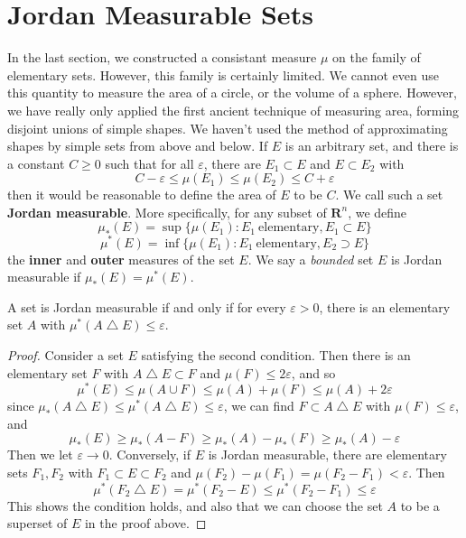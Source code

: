 \section{Jordan Measurable Sets}

In the last section, we constructed a consistant measure $\mu$ on the family of elementary sets. However, this family is certainly limited. We cannot even use this quantity to measure the area of a circle, or the volume of a sphere. However, we have really only applied the first ancient technique of measuring area, forming disjoint unions of simple shapes. We haven't used the method of approximating shapes by simple sets from above and below. If $E$ is an arbitrary set, and there is a constant $C \geq 0$ such that for all $\varepsilon$, there are $E_1 \subset E$ and $E \subset E_2$ with
%
\[ C - \varepsilon \leq \mu(E_1) \leq \mu(E_2) \leq C + \varepsilon \]
%
then it would be reasonable to define the area of $E$ to be $C$. We call such a set {\bf Jordan measurable}. More specifically, for any subset of $\mathbf{R}^n$, we define
%
\[ \mu_*(E) = \sup \{ \mu(E_1): E_1\ \text{elementary}, E_1 \subset E \} \]
\[ \mu^*(E) = \inf \{ \mu(E_1): E_1\ \text{elementary}, E_2 \supset E \} \]
%
the {\bf inner} and {\bf outer} measures of the set $E$. We say a {\it bounded} set $E$ is Jordan measurable if $\mu_*(E) = \mu^*(E)$.

\begin{theorem}
    A set is Jordan measurable if and only if for every $\varepsilon > 0$, there is an elementary set $A$ with $\mu^*(A \bigtriangleup E) \leq \varepsilon$.
\end{theorem}
\begin{proof}
    Consider a set $E$ satisfying the second condition. Then there is an elementary set $F$ with $A \bigtriangleup E \subset F$ and $\mu(F) \leq 2\varepsilon$, and so
    \[ \mu^*(E) \leq \mu(A \cup F) \leq \mu(A) + \mu(F) \leq \mu(A) + 2\varepsilon \]
    since $\mu_*(A \bigtriangleup E) \leq \mu^*(A \bigtriangleup E) \leq \varepsilon$, we can find $F \subset A \bigtriangleup E$ with $\mu(F) \leq \varepsilon$, and
    \[ \mu_*(E) \geq \mu_*(A - F) \geq \mu_*(A) - \mu_*(F) \geq \mu_*(A) - \varepsilon \]
    Then we let $\varepsilon \to 0$. Conversely, if $E$ is Jordan measurable, there are elementary sets $F_1, F_2$ with $F_1 \subset E \subset F_2$ and $\mu(F_2) - \mu(F_1) = \mu(F_2 - F_1) < \varepsilon$. Then
    \[ \mu^*(F_2 \bigtriangleup E) = \mu^*(F_2 - E) \leq \mu^*(F_2 - F_1) \leq \varepsilon \]
    This shows the condition holds, and also that we can choose the set $A$ to be a superset of $E$ in the proof above.
\end{proof}

